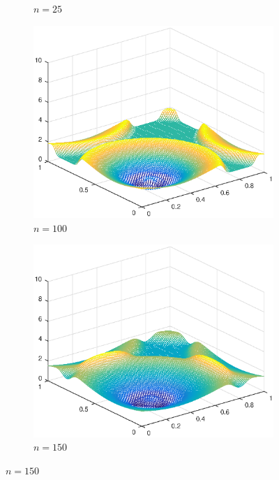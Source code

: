 \begin{figure}[h!]
\begin{subfigure}[t]{0.48\textwidth}
        \caption{$n=25$}
        \label{fig:10}
    \end{subfigure}
    \begin{subfigure}[t]{0.48\textwidth}
        \centering
        \includegraphics[width=\textwidth]{images/sol_ri_0100_per.eps}
        \caption{$n=100$}
        \label{fig:50}
    \end{subfigure}
    \begin{subfigure}[t]{0.48\textwidth}
        \centering
        \includegraphics[width=\textwidth]{images/sol_ri_0150_per.eps}
        \caption{$n=150$}
        \label{fig:100}
    \end{subfigure}

\end{figure}
